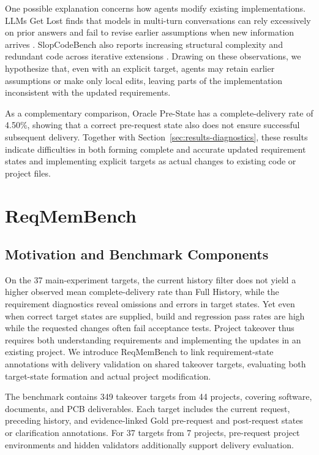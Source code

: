 \documentclass{article} %
\begin{document}
One possible explanation concerns how agents modify existing implementations. LLMs Get Lost finds that models in multi-turn conversations can rely excessively on prior answers and fail to revise earlier assumptions when new information arrives \citep{laban2025llms}. SlopCodeBench also reports increasing structural complexity and redundant code across iterative extensions \citep{orlanski2026slopcode}. Drawing on these observations, we hypothesize that, even with an explicit target, agents may retain earlier assumptions or make only local edits, leaving parts of the implementation inconsistent with the updated requirements.

As a complementary comparison, Oracle Pre-State has a complete-delivery rate of 4.50\%, showing that a correct pre-request state also does not ensure successful subsequent delivery. Together with Section~\ref{sec:results-diagnostics}, these results indicate difficulties in both forming complete and accurate updated requirement states and implementing explicit targets as actual changes to existing code or project files.

\FloatBarrier
\section{ReqMemBench}
\label{sec:reqmembench}

\subsection{Motivation and Benchmark Components}
\label{sec:benchmark-components}

On the 37 main-experiment targets, the current history filter does not yield a higher observed mean complete-delivery rate than Full History, while the requirement diagnostics reveal omissions and errors in target states. Yet even when correct target states are supplied, build and regression pass rates are high while the requested changes often fail acceptance tests. Project takeover thus requires both understanding requirements and implementing the updates in an existing project. We introduce ReqMemBench to link requirement-state annotations with delivery validation on shared takeover targets, evaluating both target-state formation and actual project modification.

The benchmark contains 349 takeover targets from 44 projects, covering software, documents, and PCB deliverables. Each target includes the current request, preceding history, and evidence-linked Gold pre-request and post-request states or clarification annotations. For 37 targets from 7 projects, pre-request project environments and hidden validators additionally support delivery evaluation.
\end{document}
